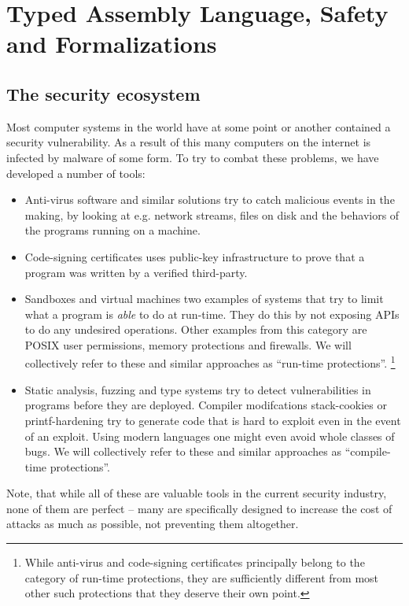 \chapter{Typed Assembly Language, Safety and Formalizations}

\section{The security ecosystem}

Most computer systems in the world have at some point or another contained a
security vulnerability. As a result of this many computers on the internet is
infected by malware of some form. To try to combat these problems, we have
developed a number of tools:

\begin{itemize}
\item Anti-virus software and similar solutions try to catch malicious events in
  the making, by looking at e.g. network streams, files on disk and the
  behaviors of the programs running on a machine.
\item Code-signing certificates uses public-key infrastructure to prove that a
  program was written by a verified third-party.
\item Sandboxes and virtual machines two examples of systems that try to limit
  what a program is \emph{able} to do at run-time. They do this by not exposing
  APIs to do any undesired operations. Other examples from this category are
  POSIX user permissions, memory protections and firewalls. We will collectively
  refer to these and similar approaches as ``run-time protections''.
  \footnote{
    While anti-virus and code-signing certificates principally belong to the
    category of run-time protections, they are sufficiently different from most
    other such protections that they deserve their own point.
  }
\item Static analysis, fuzzing and type systems try to detect vulnerabilities in
  programs before they are deployed. Compiler modifcations stack-cookies or
  printf-hardening try to generate code that is hard to exploit even in the
  event of an exploit. Using modern languages one might even avoid whole classes
  of bugs. We will collectively refer to these and similar approaches as
  ``compile-time protections''.
\end{itemize}

Note, that while all of these are valuable tools in the current security
industry, none of them are perfect -- many are specifically designed to increase
the cost of attacks as much as possible, not preventing them altogether.


